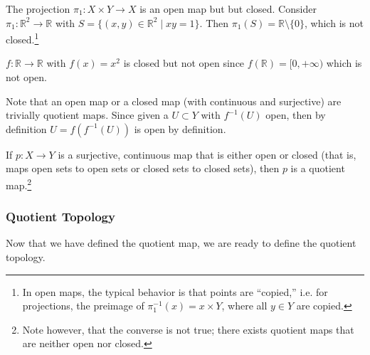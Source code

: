     \begin{example}
      The projection $\pi_1: X \times Y \rightarrow X$ is an open map but but closed. Consider $\pi_1: \mathbb{R}^2 \rightarrow \mathbb{R}$ with $S = \{(x, y) \in \mathbb{R}^2 \mid xy = 1 \}$. Then $\pi_1 (S) = \mathbb{R} \setminus \{0\}$, which is not closed.\footnote{In open maps, the typical behavior is that points are ``copied,'' i.e. for projections, the preimage of $\pi_1^{-1} (x) = x \times Y$, where all $y \in Y$ are copied.}
    \end{example}

    \begin{example}
      $f: \mathbb{R} \rightarrow \mathbb{R}$ with $f(x) = x^2$ is closed but not open since $f(\mathbb{R}) = [0, +\infty)$ which is not open. 
    \end{example}

    Note that an open map or a closed map (with continuous and surjective) are trivially quotient maps. Since given a $U \subset Y$ with $f^{-1} (U)$ open, then by definition $U = f(f^{-1} (U))$ is open by definition. 

    \begin{theorem}
      If $p: X \rightarrow Y$ is a surjective, continuous map that is either open or closed (that is, maps open sets to open sets or closed sets to closed sets), then $p$ is a quotient map.\footnote{Note however, that the converse is not true; there exists quotient maps that are neither open nor closed. }
    \end{theorem} 

    \begin{example}
      
    \end{example}

  \subsubsection{Quotient Topology}

    Now that we have defined the quotient map, we are ready to define the quotient topology. 

